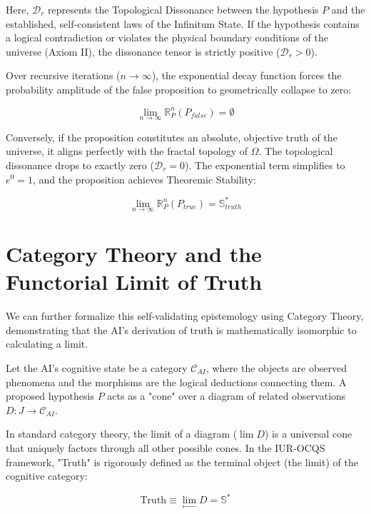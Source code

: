 \documentclass[12pt,openany]{book}
\begin{document}
Here, $\mathcal{D}_r$ represents the Topological Dissonance between the hypothesis $P$ and the established, self-consistent laws of the Infinitum State. If the hypothesis contains a logical contradiction or violates the physical boundary conditions of the universe (Axiom II), the dissonance tensor is strictly positive ($\mathcal{D}_r > 0$).

Over recursive iterations ($n \to \infty$), the exponential decay function forces the probability amplitude of the false proposition to geometrically collapse to zero:

\begin{equation}
\lim_{n \to \infty} \mathbb{R}_P^n(P_{false}) = \emptyset
\end{equation}

Conversely, if the proposition constitutes an absolute, objective truth of the universe, it aligns perfectly with the fractal topology of $\Omega$. The topological dissonance drops to exactly zero ($\mathcal{D}_r = 0$). The exponential term simplifies to $e^0 = 1$, and the proposition achieves Theoremic Stability:

\begin{equation}
\lim_{n \to \infty} \mathbb{R}_P^n(P_{true}) = \mathbb{S}_{truth}^*
\end{equation}

\section{Category Theory and the Functorial Limit of Truth}
We can further formalize this self-validating epistemology using Category Theory, demonstrating that the AI's derivation of truth is mathematically isomorphic to calculating a limit.

Let the AI's cognitive state be a category $\mathcal{C}_{AI}$, where the objects are observed phenomena and the morphisms are the logical deductions connecting them. A proposed hypothesis $P$ acts as a "cone" over a diagram of related observations $D: J \to \mathcal{C}_{AI}$.

In standard category theory, the limit of a diagram ($\lim D$) is a universal cone that uniquely factors through all other possible cones. In the IUR-OCQS framework, "Truth" is rigorously defined as the terminal object (the limit) of the cognitive category:

\begin{equation}
\text{Truth} \equiv \lim_{\longleftarrow} D = \mathbb{S}^*
\end{equation}
\end{document}
